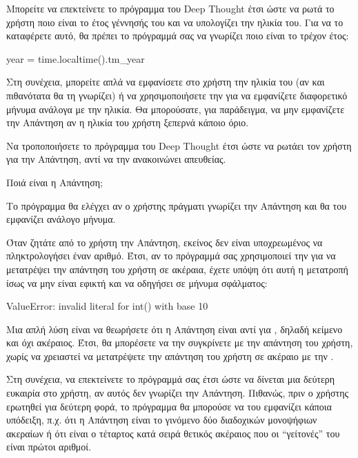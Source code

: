 \documentclass[a4paper,11pt,oneside]{book}
\begin{document}
\clearpage
\begin{exercise}
Μπορείτε να επεκτείνετε το πρόγραμμα του Deep Thought έτσι ώστε να ρωτά το χρήστη ποιο είναι το έτος γέννησής του και να υπολογίζει την ηλικία του. Για να το καταφέρετε αυτό, θα πρέπει το πρόγραμμά σας να γνωρίζει ποιο είναι το τρέχον έτος:

\begin{pycode}
year = time.localtime().tm_year
\end{pycode}

Στη συνέχεια, μπορείτε απλά να εμφανίσετε στο χρήστη την ηλικία του (αν και πιθανότατα θα τη γνωρίζει) ή να χρησιμοποιήσετε την  για να εμφανίζετε διαφορετικό μήνυμα ανάλογα με την ηλικία. 
Θα μπορούσατε, για παράδειγμα, να μην εμφανίζετε την Απάντηση αν η ηλικία του χρήστη ξεπερνά κάποιο όριο.
\end{exercise}

\begin{exercise}
Να τροποποιήσετε το πρόγραμμα του Deep Thought έτσι ώστε να ρωτάει τον χρήστη για την Απάντηση, αντί να την ανακοινώνει απευθείας. 

\begin{pyterm}
Ποιά είναι η Απάντηση;
\end{pyterm}

Το πρόγραμμα θα ελέγχει %
%
αν ο χρήστης πράγματι γνωρίζει την Απάντηση και θα του εμφανίζει ανάλογο μήνυμα. 

\begin{note}
Όταν ζητάτε από το χρήστη την Απάντηση, εκείνος δεν είναι υποχρεωμένος να πληκτρολογήσει έναν αριθμό. Έτσι, αν το πρόγραμμά σας χρησιμοποιεί την  για να μετατρέψει την απάντηση του χρήστη σε ακέραια, έχετε υπόψη ότι αυτή η μετατροπή ίσως να μην είναι εφικτή και να οδηγήσει σε μήνυμα σφάλματος:

\begin{pyterm}
ValueError: invalid literal for int() with base 10
\end{pyterm}

Μια απλή λύση είναι να θεωρήσετε ότι η Απάντηση είναι  αντί για , δηλαδή κείμενο και όχι ακέραιος. Έτσι, θα μπορέσετε να την συγκρίνετε με την απάντηση του χρήστη, χωρίς να χρειαστεί να μετατρέψετε την απάντηση του χρήστη σε ακέραιο με την .
\end{note}

Στη συνέχεια, να επεκτείνετε το πρόγραμμά σας έτσι ώστε να δίνεται μια δεύτερη ευκαιρία στο χρήστη, αν αυτός δεν γνωρίζει την Απάντηση. Πιθανώς, πριν ο χρήστης ερωτηθεί για δεύτερη φορά, το πρόγραμμα θα μπορούσε να του εμφανίζει κάποια υπόδειξη, π.χ. ότι η Απάντηση είναι το γινόμενο δύο διαδοχικών μονοψήφιων ακεραίων ή ότι είναι ο τέταρτος κατά σειρά θετικός ακέραιος που οι ``γείτονές'' του είναι πρώτοι αριθμοί.
\end{exercise}
\end{document}
